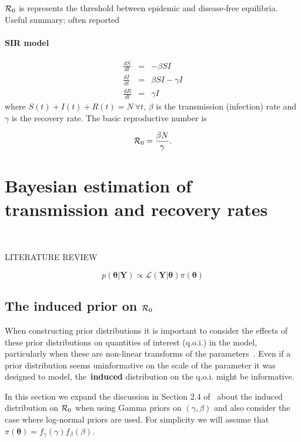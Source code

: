 \documentclass[alpha-refs]{wiley-article}
\newcommand{\rr}{ {\cal R}_0 }						%
\begin{document}
$\rr$ is represents the threshold between epidemic and disease-free equilibria.
Useful summary; often reported

\paragraph{SIR model}

\begin{eqnarray*}
\frac{dS}{dt}&=& - \beta SI\\
\frac{dI}{dt}&=&  \beta SI - \gamma I\\
\frac{dR}{dt}&=& \gamma I 
\end{eqnarray*} 
where  $S(t) + I(t) + R(t) = N \: \forall t$, $\beta$ is the transmission (infection) rate and $\gamma$ is the recovery rate.
The basic reproductive number is 

\begin{equation}
\label{eq:r0def}
\rr = \frac{\beta N}{\gamma}. 
\end{equation}

\section{Bayesian estimation of transmission and recovery rates}

~\citep{Coelho2011}



LITERATURE REVIEW

\begin{equation}
 \label{eq:posterior}
 p(\boldsymbol\theta | \boldsymbol Y) \propto \mathcal{L}(\boldsymbol Y | \boldsymbol \theta)\pi(\boldsymbol\theta)
\end{equation}


\subsection{The induced prior on $\rr$}

When constructing prior distributions it is important to consider the effects of these prior distributions on quantities of interest (q.o.i.) in the model, particularly when these are non-linear transforms of the parameters~\citep{Seaman2012}.
Even if a prior distribution seems uninformative on the scale of the parameter it was designed to model, the~\textbf{induced} distribution on the q.o.i. might be informative.

In this section we expand the discussion in Section 2.4 of~\cite{Clancy2008} about the induced distribution on $\rr$ when using Gamma priors on $(\gamma, \beta)$ and also consider the case where log-normal priors are used.
For simplicity we will assume that $\pi(\boldsymbol\theta) = f_{\gamma}(\gamma)f_{\beta}(\beta)$.
\end{document}
